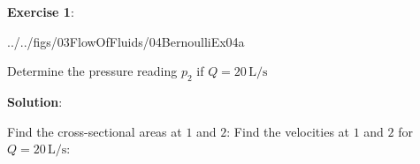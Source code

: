 \documentclass[10pt]{amsart}
\begin{document}
\begin{minipage}[t]{0.4\textwidth}
	\raggedright
	\textbf{Exercise 1}:\\
	\vspace*{-0.5cm}
	\begin{cfig}[0.42]{../../figs/03FlowOfFluids/04BernoulliEx04a}\end{cfig}
	Determine the pressure reading  $p_2$ if $Q=20\,\text{L/s}$
	
	\parb
	\textbf{Solution}:
	\parb
	
	Find the cross-sectional areas at $1$ and $2$:
	\parb
	Find the velocities at $1$ and $2$ for $Q=20\,\text{L/s}$:
\end{minipage}
\hfill
\end{document}
